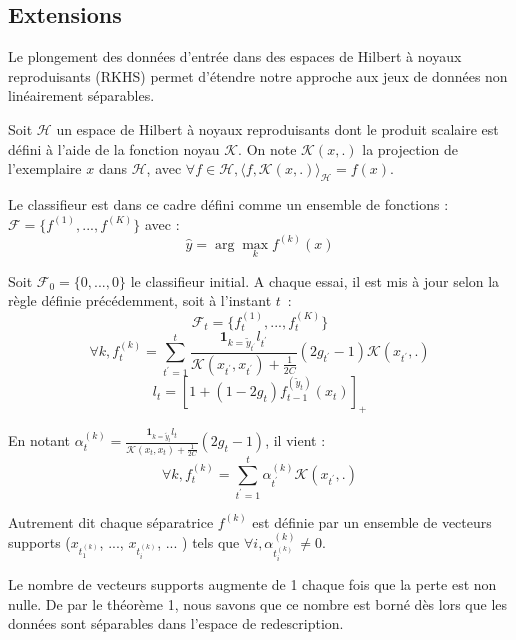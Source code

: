 \documentclass[twocolumn]{article}
\begin{document}
\subsection{Extensions}
Le plongement des données d'entrée dans des espaces de Hilbert à noyaux reproduisants (RKHS) permet d'étendre notre approche aux jeux de données non linéairement séparables. 

Soit $\mathcal{H}$ un espace de Hilbert à noyaux reproduisants dont le produit scalaire est défini à l'aide de la fonction noyau $\mathcal{K}$. On note $\mathcal{K}(x,.)$ la projection de l'exemplaire $x$ dans $\mathcal{H}$, avec $\forall f \in \mathcal{H}, \langle f,\mathcal{K}(x,.)\rangle_\mathcal{H} = f(x) $.
 

Le classifieur est dans ce cadre défini comme un ensemble de fonctions : $\mathcal{F} = \{f^{(1)}, ..., f^{(K)}\}$ avec :
$$\hat{y} = \arg \max_k f^{(k)}(x)$$

Soit $\mathcal{F}_0=\{0, ..., 0\}$ le classifieur initial. A chaque essai, il est mis à jour selon la règle définie précédemment, soit à l'instant $t$~:
$$\mathcal{F}_t = \{f^{(1)}_t, ..., f^{(K)}_t\}$$
$$\forall k, f^{(k)}_t = \sum_{t^\prime = 1} ^t  \frac {\mathbf{1}_{k=\tilde{y}_{t^\prime}}l_{t^\prime}}{\mathcal{K}(x_{t^\prime},x_{t^\prime})+\frac{1}{2C}} (2g_{t^\prime} - 1)\mathcal{K}(x_{t^\prime},.)$$
$$ l_t = [1 + (1-2g_t) f_{t-1}^{(\tilde{y}_t)}(x_t)]_+$$

En notant $\alpha_t^{(k)} = \frac {\mathbf{1}_{k=\tilde{y}_{t}}l_{t}}{\mathcal{K}(x_{t},x_{t})+\frac{1}{2C}} (2g_{t} - 1)$, il vient :
$$\forall k, f^{(k)}_t = \sum_{t^\prime = 1} ^t \alpha_{t^\prime}^{(k)} \mathcal{K}(x_{t^\prime},.)$$

Autrement dit chaque séparatrice $f^{(k)}$ est définie par un ensemble de vecteurs supports ($x_{t_1^{(k)}}$, ..., $x_{t_i^{(k)}}$, ...  ) tels que $\forall i, \alpha_{t_i^{(k)}}^{(k)} \neq 0$.


Le nombre de vecteurs supports augmente de 1 chaque fois que la perte est non nulle. De par le théorème 1, nous savons que ce nombre est borné dès lors que les données sont séparables dans l'espace de redescription. 
\end{document}
